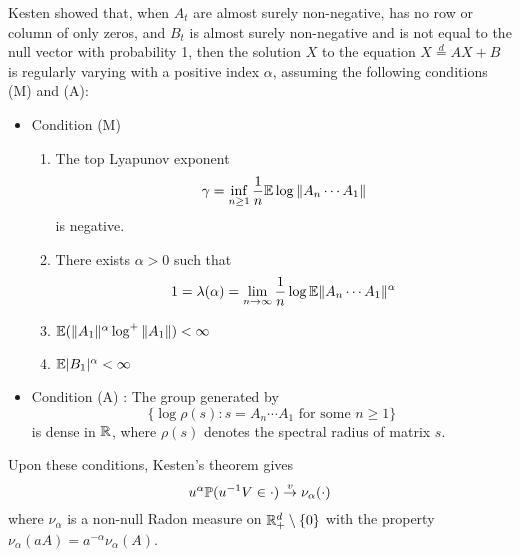 Kesten \cite{kesten:1973} showed that, when $A_t$ are almost
surely non-negative, has no row or column of only zeros, and
$B_t$ is almost surely non-negative and is not equal to the null
vector with probability 1, then the solution $X$ to the equation
$X \overset{d}{=} A X + B$ is regularly varying with a positive index
$\alpha$, assuming the following conditions (M) and (A):
\begin{itemize}
\item Condition (M)
  \begin{enumerate}
  \item The top Lyapunov exponent
    \[
    \gamma = \inf_{n \geq 1} {1 \over n}\E \log \|A_n \cdots A_1\|
    \]
    is negative.
  \item There exists $\alpha > 0$ such that
    \[
    1 = \lambda(\alpha) = \lim_{n \to \infty} {1 \over n} \log \E \|A_n \cdots A_1\|^\alpha
    \]
  \item $\E (\|A_1\|^\alpha \log^+\|A_1\|) < \infty$
  \item $\E |B_1|^\alpha < \infty$
  \end{enumerate}
\item Condition (A) : The group generated by
  \[
  \{\log\rho(s): s = A_n \cdots A_1 \text{ for some } n \geq 1\}
  \]
  is dense in $\reals$, where $\rho(s)$ denotes the spectral
  radius of matrix $s$.
\end{itemize}
Upon these conditions, Kesten's theorem gives
\begin{equation*}
  u^\alpha \P(u^{-1} V \in \cdot) \overset{v}{\to} \nu_\alpha(\cdot)
\end{equation*}
where $\nu_\alpha$ is a non-null Radon measure on
$\reals^d_+ \setminus \{0\}$ with the property
$\nu_\alpha(a A) = a^{-\alpha} \nu_\alpha(A)$.

